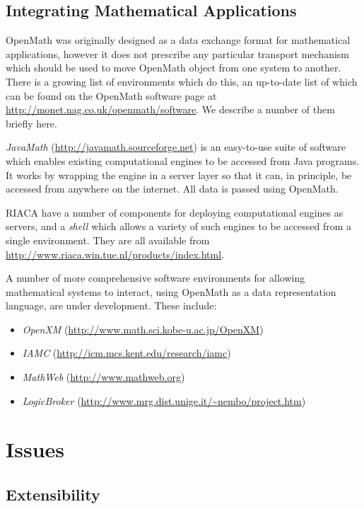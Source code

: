 \documentclass[report,keylogo]{openmath}
\begin{document}
\subsection{Integrating Mathematical Applications}

OpenMath was originally designed as a data exchange format for
mathematical applications, however it does not prescribe any
particular transport mechanism which should be used to move OpenMath
object from one system to another.  There is a growing list of
environments which do this, an up-to-date list of which can be found
on the OpenMath software page at
\url{http://monet.nag.co.uk/openmath/software}.  We describe a number
of them briefly here.

\emph{JavaMath} (\url{http://javamath.sourceforge.net}) is an
easy-to-use suite of software which enables existing computational
engines to be accessed from Java programs.  It works by wrapping the
engine in a server layer so that it can, in principle, be accessed
from anywhere on the internet.  All data is passed using OpenMath.

RIACA have a number of components for deploying computational engines as
servers, and a \emph{shell} which allows a variety of such engines to be
accessed from a single environment.  They are all available from
\url{http://www.riaca.win.tue.nl/products/index.html}.

A number of more comprehensive software environments for allowing
mathematical systems to interact, using OpenMath as a data
representation language, are under development.  These include:
\begin{itemize}
\item \emph{OpenXM} (\url{http://www.math.sci.kobe-u.ac.jp/OpenXM})
\item \emph{IAMC} (\url{http://icm.mcs.kent.edu/research/iamc})
\item \emph{MathWeb} (\url{http://www.mathweb.org})
\item \emph{LogicBroker} (\url{http://www.mrg.dist.unige.it/~nembo/project.htm})
\end{itemize}

\section {Issues}

\subsection{Extensibility}\label{extensibility}
\end{document}
